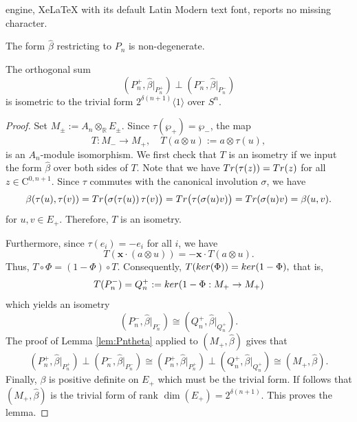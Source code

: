 \documentclass[10pt,a4paper]{amsart}
\newcommand{\C}{\mathrm{C}}
\newcommand{\Ker}{\textnormal{ker}}
\newcommand{\tr}{\textnormal{Tr}}
\begin{document}
engine, XeLaTeX with its default Latin Modern text font, reports no missing character.
\begin{lem}\label{lem:Pntheta}
The form $\hat\beta$ restricting to $P_n$ is non-degenerate. 
\end{lem}

\begin{lem}\label{lem:spinor-decompose}
The orthogonal sum
\[(P_n^+,\hat\beta|_{P_n^+})\perp (P_n^-,\hat\beta|_{P_n^-})\]
is isometric to the trivial form $2^{\delta(n+1)} \langle 1 \rangle$ over $S^n$.
\end{lem}

\begin{proof}
Set $M_\pm:=A_n\otimes_{\mathbb R}E_\pm.$
Since $\tau(\wp_+)=\wp_-$, the map
\[ T:M_-\longrightarrow M_+,
\quad
T(a\otimes u):=a\otimes \tau(u), \]
is an $A_n$-module isomorphism. We first check that $T$ is an isometry if we input the form $\hat\beta$ over both sides of $T$. Note that we have
$\tr(\tau(z))=\tr(z)$
for all  $z\in \C^{0,n+1}$.
Since $\tau$ commutes with the canonical involution $\sigma$, we have
\[\beta(\tau(u),\tau(v))
= \tr \bigl(\sigma(\tau(u))\,\tau(v)\bigr)
= \tr \bigl(\tau(\sigma(u)v)\bigr)
= \tr(\sigma(u)v)
= \beta(u,v).\]
for $u,v\in E_+$. Therefore, $T$ is an isometry.

Furthermore, since $\tau(e_i)=-e_i$ for all $i$, we have
\[T(\mathbf{x}\cdot (a\otimes u))
=-\mathbf{x}\cdot T(a\otimes u).\]
Thus, $ T\circ \Phi=(1-\Phi)\circ T.$
Consequently,
$T(\Ker(\Phi))=\Ker(1-\Phi),$
that is,
\[T(P_n^-)=Q_n^+:=\Ker(1-\Phi:M_+\to M_+) \]
which yields an isometry
\[(P_n^-,\hat\beta|_{P_n^-})\cong (Q_n^+,\hat\beta|_{Q_n^+}).\]
The proof of Lemma \ref{lem:Pntheta} applied to $(M_+, \hat\beta)$ gives that
\[(P_n^+,\hat\beta|_{P_n^+})\perp (P_n^-,\hat\beta|_{P_n^-})
\cong (P_n^+,\hat\beta|_{P_n^+})\perp (Q_n^+,\hat\beta|_{Q_n^+})
\cong (M_+,\hat\beta).\]
Finally, $\beta$ is positive definite on $E_+$ which must be the trivial form. If follows that
$(M_+,\hat\beta)$
is the trivial form of rank $\dim(E_+)=2^{\delta(n+1)}$.
This proves the lemma.
\end{proof}
\end{document}
